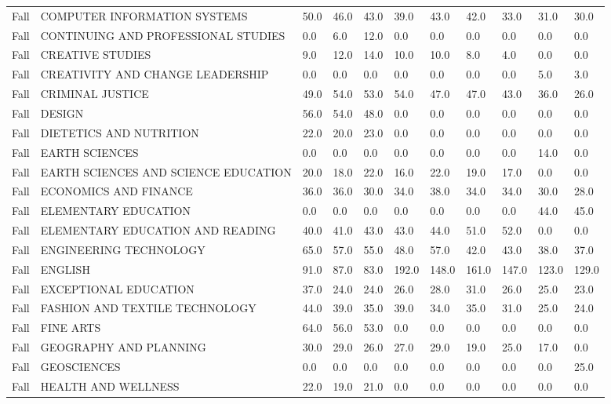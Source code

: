 \documentclass{article}
\begin{document}
\begin{longtable}[]{|l|p{4cm}|p{0.8cm}|p{0.8cm}|p{0.8cm}|p{0.8cm}|p{0.8cm}|p{0.8cm}|p{0.8cm}|p{0.8cm}|p{0.8cm}|}
Fall & COMPUTER INFORMATION SYSTEMS & 50.0 & 46.0 & 43.0 & 39.0 & 43.0 &
42.0 & 33.0 & 31.0 & 30.0 \\
Fall & CONTINUING AND PROFESSIONAL STUDIES & 0.0 & 6.0 & 12.0 & 0.0 &
0.0 & 0.0 & 0.0 & 0.0 & 0.0 \\
Fall & CREATIVE STUDIES & 9.0 & 12.0 & 14.0 & 10.0 & 10.0 & 8.0 & 4.0 &
0.0 & 0.0 \\
Fall & CREATIVITY AND CHANGE LEADERSHIP & 0.0 & 0.0 & 0.0 & 0.0 & 0.0 &
0.0 & 0.0 & 5.0 & 3.0 \\
Fall & CRIMINAL JUSTICE & 49.0 & 54.0 & 53.0 & 54.0 & 47.0 & 47.0 & 43.0
& 36.0 & 26.0 \\
Fall & DESIGN & 56.0 & 54.0 & 48.0 & 0.0 & 0.0 & 0.0 & 0.0 & 0.0 &
0.0 \\
Fall & DIETETICS AND NUTRITION & 22.0 & 20.0 & 23.0 & 0.0 & 0.0 & 0.0 &
0.0 & 0.0 & 0.0 \\
Fall & EARTH SCIENCES & 0.0 & 0.0 & 0.0 & 0.0 & 0.0 & 0.0 & 0.0 & 14.0 &
0.0 \\
Fall & EARTH SCIENCES AND SCIENCE EDUCATION & 20.0 & 18.0 & 22.0 & 16.0
& 22.0 & 19.0 & 17.0 & 0.0 & 0.0 \\
Fall & ECONOMICS AND FINANCE & 36.0 & 36.0 & 30.0 & 34.0 & 38.0 & 34.0 &
34.0 & 30.0 & 28.0 \\
Fall & ELEMENTARY EDUCATION & 0.0 & 0.0 & 0.0 & 0.0 & 0.0 & 0.0 & 0.0 &
44.0 & 45.0 \\
Fall & ELEMENTARY EDUCATION AND READING & 40.0 & 41.0 & 43.0 & 43.0 &
44.0 & 51.0 & 52.0 & 0.0 & 0.0 \\
Fall & ENGINEERING TECHNOLOGY & 65.0 & 57.0 & 55.0 & 48.0 & 57.0 & 42.0
& 43.0 & 38.0 & 37.0 \\
Fall & ENGLISH & 91.0 & 87.0 & 83.0 & 192.0 & 148.0 & 161.0 & 147.0 &
123.0 & 129.0 \\
Fall & EXCEPTIONAL EDUCATION & 37.0 & 24.0 & 24.0 & 26.0 & 28.0 & 31.0 &
26.0 & 25.0 & 23.0 \\
Fall & FASHION AND TEXTILE TECHNOLOGY & 44.0 & 39.0 & 35.0 & 39.0 & 34.0
& 35.0 & 31.0 & 25.0 & 24.0 \\
Fall & FINE ARTS & 64.0 & 56.0 & 53.0 & 0.0 & 0.0 & 0.0 & 0.0 & 0.0 &
0.0 \\
Fall & GEOGRAPHY AND PLANNING & 30.0 & 29.0 & 26.0 & 27.0 & 29.0 & 19.0
& 25.0 & 17.0 & 0.0 \\
Fall & GEOSCIENCES & 0.0 & 0.0 & 0.0 & 0.0 & 0.0 & 0.0 & 0.0 & 0.0 &
25.0 \\
Fall & HEALTH AND WELLNESS & 22.0 & 19.0 & 21.0 & 0.0 & 0.0 & 0.0 & 0.0
& 0.0 & 0.0 \\

\end{longtable}
\end{document}
